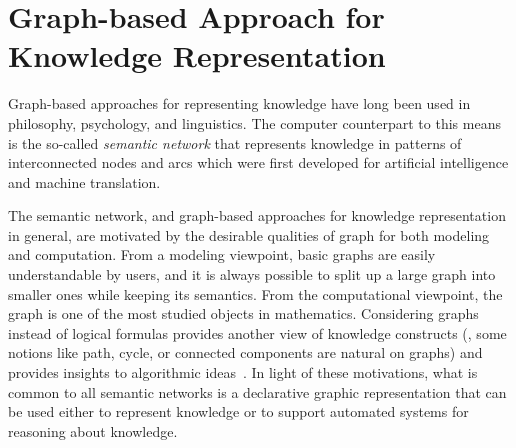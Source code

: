 \section{Graph-based Approach for Knowledge Representation}
Graph-based approaches for representing knowledge have long been used in philosophy, psychology, and linguistics. The computer counterpart to this means is the so-called \emph{semantic network} that represents knowledge in patterns of interconnected nodes and arcs which were first developed for artificial intelligence and machine translation.

The semantic network, and graph-based approaches for knowledge representation in general, are motivated by the desirable qualities of graph for both modeling and computation. From a modeling viewpoint, basic graphs are easily understandable by users, and it is always possible to split up a large graph into smaller ones while keeping its semantics. From the computational viewpoint, the graph is one of the most studied objects in mathematics. Considering graphs instead of logical formulas provides another view of knowledge constructs (\eg, some notions like path, cycle, or connected components are natural on graphs) and provides insights to algorithmic ideas~\cite{CheinMugnier08}. In light of these motivations, what is common to all semantic networks is a declarative graphic representation that can be used either to represent knowledge or to support automated systems for reasoning about knowledge.

